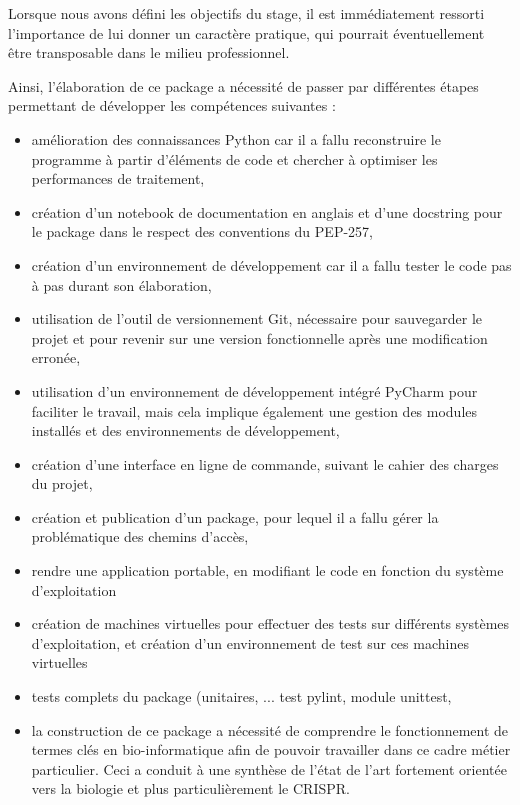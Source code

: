 \documentclass[twoside,a4paper,11pt,frenchb,openany]{report}
\begin{document}
Lorsque nous avons défini les objectifs du stage, il est immédiatement ressorti l'importance de lui donner un caractère pratique, qui pourrait éventuellement être transposable dans le milieu professionnel.

Ainsi, l'élaboration de ce package a nécessité de passer par différentes étapes permettant de développer les compétences suivantes :
\begin{itemize}
\item amélioration des connaissances Python car il a fallu reconstruire le programme à partir d'éléments de code et chercher à optimiser les performances de traitement,
\item création d'un notebook de documentation en anglais et d'une docstring pour le package dans le respect des conventions du PEP-257,
\item création d'un environnement de développement car il a fallu tester le code pas à pas durant son élaboration,
\item utilisation de l'outil de versionnement Git, nécessaire pour sauvegarder le projet et pour revenir sur une version fonctionnelle après une modification erronée, 
\item utilisation d'un environnement de développement intégré PyCharm pour faciliter le travail, mais cela implique également une gestion des modules installés et des environnements de développement,
\item création d'une interface en ligne de commande, suivant le cahier des charges du projet,
\item création et publication d'un package, pour lequel il a fallu gérer la problématique des chemins d'accès, 
\item rendre une application portable, en modifiant le code en fonction du système d'exploitation
\item création de machines virtuelles pour effectuer des tests sur différents systèmes d'exploitation, et création d'un environnement de test sur ces machines virtuelles
\item tests complets du package (unitaires, ... test pylint, module unittest,
\item la construction de ce package a nécessité de comprendre le fonctionnement de termes clés en bio-informatique afin de pouvoir travailler dans ce cadre métier particulier. Ceci a conduit à une synthèse de l'état de l'art fortement orientée vers la biologie et plus particulièrement le CRISPR.
\end{itemize}
\end{document}
